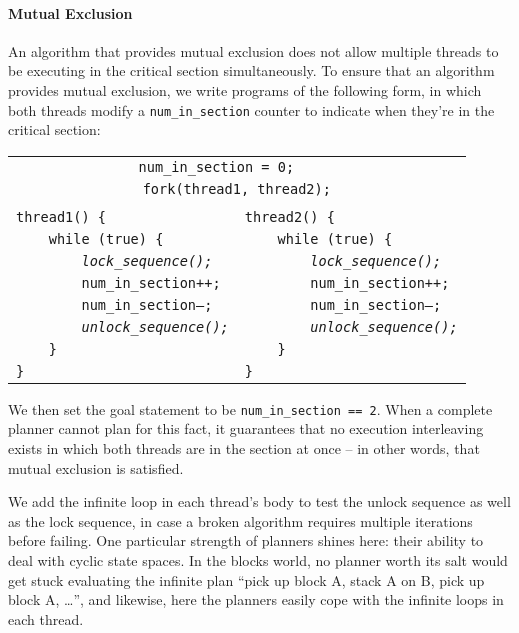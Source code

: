 \paragraph{Mutual Exclusion}
An algorithm that provides mutual exclusion does not allow multiple threads to be executing in the critical section simultaneously. To ensure that an algorithm provides mutual exclusion, we write programs of the following form, in which both threads modify a \texttt{num\_in\_section} counter to indicate when they're in the critical section:
%
\begin{center} \small
\begin{tabular}{ll}
\multicolumn{2}{c}{\texttt{num\_in\_section = 0;~~~~~}} \\
\multicolumn{2}{c}{\texttt{fork(thread1, thread2);}} \\
& \\
\texttt{thread1() \{} & \texttt{thread2() \{} \\
\texttt{~~~~while (true) \{} & \texttt{~~~~while (true) \{} \\
\texttt{~~~~~~~~\em lock\_sequence();} & \texttt{~~~~~~~~\em lock\_sequence();} \\
\texttt{~~~~~~~~num\_in\_section++;} & \texttt{~~~~~~~~num\_in\_section++;} \\
\texttt{~~~~~~~~num\_in\_section--;} & \texttt{~~~~~~~~num\_in\_section--;} \\
\texttt{~~~~~~~~\em unlock\_sequence();\qquad} & \texttt{~~~~~~~~\em unlock\_sequence();} \\
\texttt{~~~~\}} & \texttt{~~~~\}} \\
\texttt{\}} & \texttt{\}} \\
\end{tabular}
\end{center}
%
We then set the goal statement to be \texttt{num\_in\_section == 2}. When a complete planner cannot plan for this fact, it guarantees that no execution interleaving exists in which both threads are in the section at once -- in other words, that mutual exclusion is satisfied.

We add the infinite loop in each thread's body to test the unlock sequence as well as the lock sequence, in case a broken algorithm requires multiple iterations before failing. One particular strength of planners shines here: their ability to deal with cyclic state spaces. In the blocks world, no planner worth its salt would get stuck evaluating the infinite plan ``pick up block A, stack A on B, pick up block A, \dots'', and likewise, here the planners easily cope with the infinite loops in each thread.

